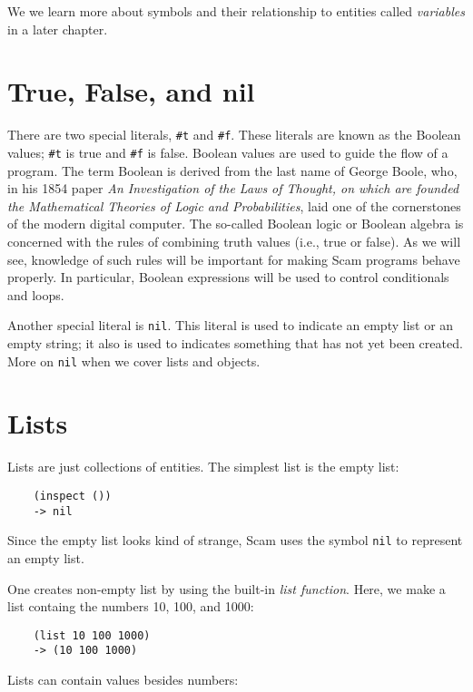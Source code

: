We we learn more about symbols and their relationship to entities
called {\it variables} in a later chapter.

\section{True, False, and nil}

There are two special literals, \verb!#t!
and \verb!#f!.
These literals are known as the {\sc Boolean} values;
\verb!#t! is true and \verb!#f! is false.
Boolean values are used to guide the flow of a program.
The term {\sc Boolean} is derived from the last name of George Boole, who,
in his 1854 paper {\it An Investigation of the Laws of Thought, on which are
founded the Mathematical Theories of Logic and Probabilities}, laid one
of the cornerstones of the modern digital computer. The so-called {\sc Boolean}
logic or {\sc Boolean} algebra is concerned with the rules of combining truth
values (i.e., true or false). As we will see, knowledge of such rules will
be important for making Scam programs behave properly. In particular,
{\sc Boolean} expressions will be used to control conditionals and loops.

Another special literal is \verb!nil!.
This literal is used to
indicate an empty list or an empty string; it also is used
to indicates something that has not yet been
created. More on \verb!nil! when we cover lists and
objects.

\section{Lists}

Lists are just collections of entities.
The simplest list is the empty list:

\begin{verbatim}
    (inspect ())
    -> nil
\end{verbatim}

Since the empty list looks kind of strange, Scam uses the symbol \verb!nil!
to represent an empty list.

One creates non-empty list by
using the built-in {\it list function}. 
Here, we make a list containg the numbers
10, 100, and 1000:

\begin{verbatim}
    (list 10 100 1000)
    -> (10 100 1000)
\end{verbatim}

Lists can contain values besides numbers:

